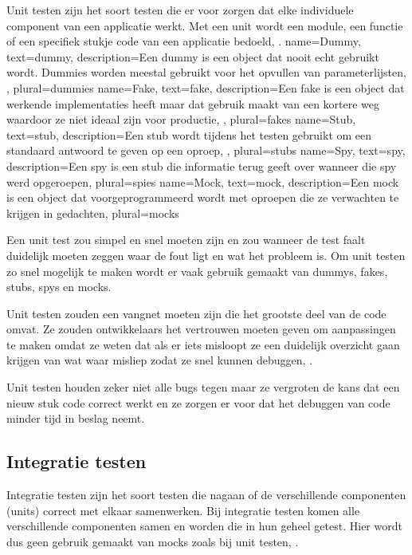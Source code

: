 Unit testen zijn het soort testen die er voor zorgen dat elke individuele component van een applicatie werkt. Met een unit wordt een module, een functie of een specifiek stukje code van een applicatie bedoeld, \textcite{Elliott2016}.
{
    name=Dummy,
    text=dummy,
    description={Een dummy is een object dat nooit echt gebruikt wordt. Dummies worden meestal gebruikt voor het opvullen van parameterlijsten, \textcite{Fowler2007}},
    plural={dummies}
}
{
    name=Fake,
    text=fake,
    description={Een fake is een object dat werkende implementaties heeft maar dat gebruik maakt van een kortere weg waardoor ze niet ideaal zijn voor productie, \textcite{Fowler2007}},
    plural={fakes}
}
{
    name=Stub,
    text=stub,
    description={Een stub wordt tijdens het testen gebruikt om een standaard antwoord te geven op een oproep, \textcite{Fowler2007}},
    plural={stubs}
}
{
    name=Spy,
    text=spy,
    description={Een spy is een \gls{stub} die informatie terug geeft over wanneer die spy werd opgeroepen, \textcite{Fowler2007}}
    plural={spies}
}
{
    name=Mock,
    text=mock,
    description={Een mock is een object dat voorgeprogrammeerd wordt met oproepen die ze verwachten te krijgen in gedachten, \textcite{Fowler2007}}
    plural={mocks}
}

Een unit test zou simpel en snel moeten zijn en zou wanneer de test faalt duidelijk moeten zeggen waar de fout ligt en wat het probleem is. Om unit testen zo snel mogelijk te maken wordt er vaak gebruik gemaakt van \glspl{dummy}, \glspl{fake}, \glspl{stub}, \glspl{spy} en \glspl{mock}. 

Unit testen zouden een vangnet moeten zijn die het grootste deel van de code omvat. Ze zouden ontwikkelaars het vertrouwen moeten geven om aanpassingen te maken omdat ze weten dat als er iets misloopt ze een duidelijk overzicht gaan krijgen van wat waar misliep zodat ze snel kunnen debuggen, \textcite{Zilberfeld2013}.

Unit testen houden zeker niet alle bugs tegen maar ze vergroten de kans dat een nieuw stuk code correct werkt en ze zorgen er voor dat het debuggen van code minder tijd in beslag neemt.

\subsection{Integratie testen}

Integratie testen zijn het soort testen die nagaan of de verschillende componenten (units) correct met elkaar samenwerken. Bij integratie testen komen alle verschillende componenten samen en worden die in hun geheel getest. Hier wordt dus geen gebruik gemaakt van \glspl{mock} zoals bij unit testen, \textcite{Reselman2017}.

